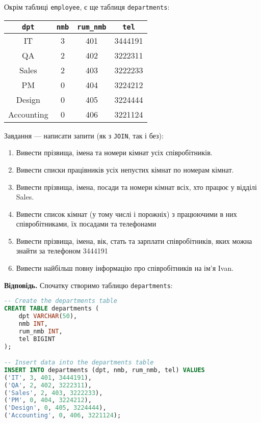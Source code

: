 \documentclass{hw_template}
\begin{document}
\begin{problem}
    Окрім таблиці \texttt{employee}, є ще таблиця \texttt{departments}:
    \begin{table}[H]
        \centering
        \begin{tabular}{|c|c|c|c|}
            \hline
            \texttt{dpt} & \texttt{nmb} & \texttt{rum\_nmb} & \texttt{tel} \\
            \hline
            IT & 3 & 401 & 3444191 \\
            QA & 2 & 402 & 3222311 \\
            Sales & 2 & 403 & 3222233 \\
            PM & 0 & 404 & 3224212 \\
            Design & 0 & 405 & 3224444 \\
            Accounting & 0 & 406 & 3221124 \\
            \hline
        \end{tabular}
    \end{table}
    Завдання --- написати запити (як з \texttt{JOIN}, так і без):
    \begin{enumerate}
        \item Вивести прізвища, імена та номери кімнат усіх співробітників.
        \item Вивести списки працівників усіх непустих кімнат по номерам кімнат.
        \item Вивести прізвища, імена, посади та номери кімнат всіх, хто працює у відділі Sales.
        \item Вивести список кімнат (у тому числі і порожніх) з працюючими в них співробітниками, їх
        посадами та телефонами
        \item Вивести прізвища, імена, вік, стать та зарплати співробітників, яких можна знайти за
        телефоном 3444191
        \item Вивести найбільш повну інформацію про співробітників на ім'я Ivan.
    \end{enumerate}
\end{problem}

\textbf{Відповідь.} Спочатку створимо таблицю \texttt{departments}:
\begin{lstlisting}[language=SQL]
-- Create the departments table
CREATE TABLE departments (
    dpt VARCHAR(50),
    nmb INT,
    rum_nmb INT,
    tel BIGINT
);

-- Insert data into the departments table
INSERT INTO departments (dpt, nmb, rum_nmb, tel) VALUES
('IT', 3, 401, 3444191),
('QA', 2, 402, 3222311),
('Sales', 2, 403, 3222233),
('PM', 0, 404, 3224212),
('Design', 0, 405, 3224444),
('Accounting', 0, 406, 3221124);
\end{lstlisting}
\end{document}
